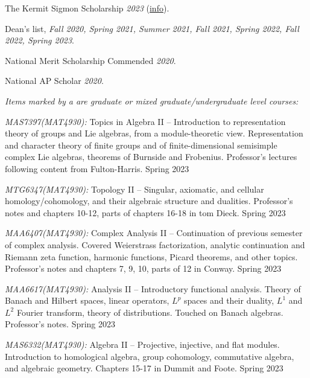 \documentclass[11pt]{article}
\begin{document}

The Kermit Sigmon Scholarship \textsl{2023} ({\color{blue}\href{https://math.ufl.edu/mathematics-major/opportunities-for-undergraduates/the-kermit-sigmon-scholarship/}{info}}).

Dean's list, \textsl{Fall 2020, Spring 2021, Summer 2021, Fall 2021, Spring 2022, Fall 2022, Spring 2023}.

National Merit Scholarship Commended \textsl{2020}.

National AP Scholar \textsl{2020}.


\textsl{Items marked by a \textsuperscript{\textdagger} are graduate or mixed graduate/undergraduate level courses:}

\textsl{MAS7397(MAT4930)\textsuperscript{\textdagger}:} Topics in Algebra II -- Introduction to representation theory of groups and Lie algebras, from a module-theoretic view. Representation and character theory of finite groups and of finite-dimensional semisimple complex Lie algebras, theorems of Burnside and Frobenius. Professor's lectures following content from Fulton-Harris. Spring 2023

\textsl{MTG6347(MAT4930)\textsuperscript{\textdagger}:} Topology II -- Singular, axiomatic, and cellular homology/cohomology, and their algebraic structure and dualities. Professor's notes and chapters 10-12, parts of chapters 16-18 in tom Dieck. Spring 2023

\textsl{MAA6407(MAT4930)\textsuperscript{\textdagger}:} Complex Analysis II -- Continuation of previous semester of complex analysis. Covered Weierstrass factorization, analytic continuation and Riemann zeta function, harmonic functions, Picard theorems, and other topics. Professor's notes and chapters 7, 9, 10, parts of 12 in Conway. Spring 2023

\textsl{MAA6617(MAT4930)\textsuperscript{\textdagger}:} Analysis II -- Introductory functional analysis. Theory of Banach and Hilbert spaces, linear operators, $L^p$ spaces and their duality, $L^1$ and $L^2$ Fourier transform, theory of distributions. Touched on Banach algebras. Professor's notes. Spring 2023

\textsl{MAS6332(MAT4930)\textsuperscript{\textdagger}:} Algebra II -- Projective, injective, and flat modules. Introduction to homological algebra, group cohomology, commutative algebra, and algebraic geometry. Chapters 15-17 in Dummit and Foote. Spring 2023
\end{document}
